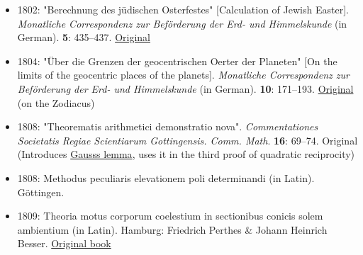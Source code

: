 \begin{itemize}
  \begin{itemize}
  \tightlist
  \item
    {Gauss, Carl Friedrich (1986). \href{https://link.springer.com/book/10.1007/978-1-4939-7560-0\#about-this-book}{\emph{Disquisitiones Arithmeticae \& other papers on number theory}}. Translated by Clarke, Arthur A. (2nd, corrected{~}ed.). New York: \href{https://en.wikipedia.org/wiki/Springer_Science+Business_Media}{Springer}. \href{https://en.wikipedia.org/wiki/Doi_(identifier)}{doi}:\href{https://doi.org/10.1007\%2F978-1-4939-7560-0}{10.1007/978-1-4939-7560-0}. \href{https://en.wikipedia.org/wiki/ISBN_(identifier)}{ISBN}{~}\href{https://en.wikipedia.org/wiki/Special:BookSources/978-0-387-96254-2}{978-0-387-96254-2}.{} (translated from the \href{https://www.science.org/doi/10.1126/science.154.3749.642.b}{second German edition, Göttingen 1860})}
  \end{itemize}
\item
  {1802: "Berechnung des jüdischen Osterfestes" {{[}}Calculation of Jewish Easter{{]}}. \emph{Monatliche Correspondenz zur Beförderung der Erd- und Himmelskunde} (in German). \textbf{5}: {435--}437.{} \href{https://zs.thulb.uni-jena.de/rsc/viewer/jportal_derivate_00237503/Monatlich_Correspondenz_130168688_5_1802_0444\%20.tif}{Original}}
\item
  {1804: "Über die Grenzen der geocentrischen Oerter der Planeten" {{[}}On the limits of the geocentric places of the planets{{]}}. \emph{Monatliche Correspondenz zur Beförderung der Erd- und Himmelskunde} (in German). \textbf{10}: {171--}193.{} \href{https://zs.thulb.uni-jena.de/rsc/viewer/jportal_derivate_00240854/Monatliche_Correspondenz_130168688_10_0175.tif}{Original} (on the Zodiacus)}
\item
  {1808: "Theorematis arithmetici demonstratio nova". \emph{Commentationes Societatis Regiae Scientiarum Gottingensis. Comm. Math}. \textbf{16}: {69--}74.{} Original (Introduces \href{https://en.wikipedia.org/wiki/Gauss's_lemma_(number_theory)}{Gauss\textquotesingle s lemma}, uses it in the third proof of quadratic reciprocity)}
\item
  {1808: Methodus peculiaris elevationem poli determinandi (in Latin). Göttingen.{}}
\item
  {1809: Theoria motus corporum coelestium in sectionibus conicis solem ambientium (in Latin). Hamburg: Friedrich Perthes \& Johann Heinrich Besser.{} \href{https://gutenberg.beic.it/webclient/DeliveryManager?pid=12217180}{Original book}}


\end{itemize}
